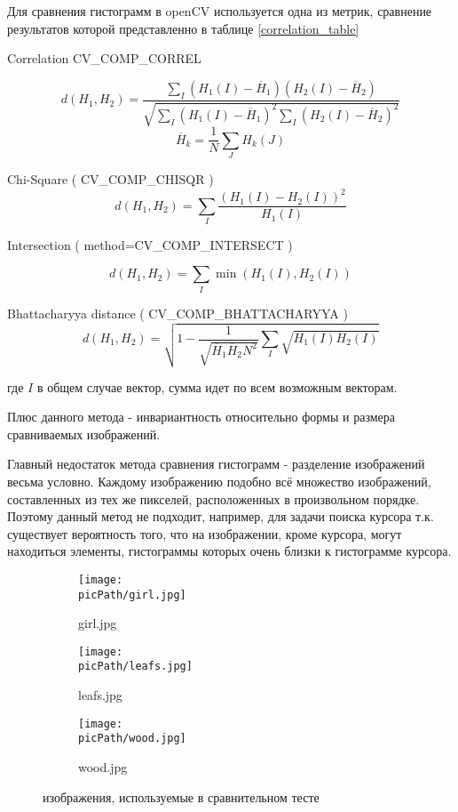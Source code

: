 \documentclass[oneside,final,14pt]{extreport}
\newcommand{\picPath}{pictures}
\begin{document}
Для сравнения гистограмм в openCV используется одна из метрик, сравнение результатов которой представленно в таблице \ref{correlation_table}

Correlation  CV\_COMP\_CORREL
 
$$
d(H_1,H_2) 
= 
\frac{
\sum_I(H_1(I) - \overline{H}_1)
(H_2(I)-\overline{H}_2)
}{
	\sqrt{
		\sum_I(H_1(I) - \overline{H}_1)^2
		\sum_I(H_2(I) - \overline{H}_2)^2
	}
}
$$
$$
\overline{H}_k 
= 
\frac{1}{N}
\sum_J H_k(J)
$$

Chi-Square ( CV\_COMP\_CHISQR )
$$
d(H_1,H_2)
=
\sum_I \frac{
	(H_1(I) - H_2(I))^2}
{H_1(I)}
$$

Intersection ( method=CV\_COMP\_INTERSECT )

$$
d(H_1,H_2)
=
\sum_I 
\min (H_1(I),H_2(I))
$$

Bhattacharyya distance ( CV\_COMP\_BHATTACHARYYA )
$$
d(H_1,H_2)
=
\sqrt{ 1 - 
\frac{1}{
  \sqrt{\overline{H}_1 
  		\overline{H}_2
  		N^2}
  }
  \sum_I
  \sqrt{H_1(I) H_2(I)}
}
$$

где $I$ в общем случае вектор, сумма идет по всем возможным векторам.


Плюс данного метода - инвариантность относительно формы и размера сравниваемых изображений.

Главный недостаток метода сравнения гистограмм -   разделение изображений весьма условно. Каждому изображению подобно всё множество изображений, составленных из тех же пикселей, расположенных в произвольном порядке. Поэтому данный метод не подходит, например,  для задачи поиска курсора т.к. существует вероятность того, что на изображении, кроме курсора, могут находиться элементы, гистограммы которых очень близки к гистограмме курсора.   

\begin{figure}[H]
\begin{center}
\begin{subfigure}[b]{0.2\linewidth}
    	\texttt{[image: \\picPath/girl.jpg]}
    	\caption{ girl.jpg}
  \end{subfigure}
  \begin{subfigure}[b]{0.3\linewidth}
    	\texttt{[image: \\picPath/leafs.jpg]}
    	\caption{ leafs.jpg}
  \end{subfigure}
  \begin{subfigure}[b]{0.3\linewidth}
    	\texttt{[image: \\picPath/wood.jpg]}
    	\caption{ wood.jpg}
  \end{subfigure}
\end{center}
  \caption{изображения, используемые в сравнительном тесте  }
\end{figure}
\end{document}
